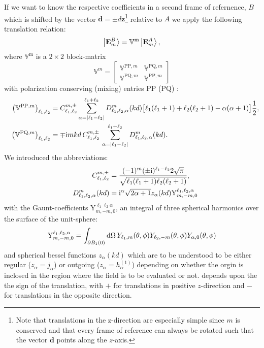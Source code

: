 If we want to know the respective coefficients in a second frame of refernence, $B$ which is shifted by the vector $\mathbf{d}=\pm d \mathbf{z}$\footnote{Note that translations in the z-direction are especially simple since $m$ is conserved and that every frame of reference can always be rotated such that the vector $\mathbf{d}$ points along the $z$-axis.} relative to $A$ we apply the following translation relation:
\begin{equation}
\ket{\mathbf{E}_m^B} = \mathbb{V}^\text{m} \ket{\mathbf{E}_m^A},
\end{equation}
where $\mathbb{V}^\text{m}$ is a $2\times 2$ block-matrix
\begin{equation}
\mathbb{V}^m = \left[
\begin{matrix}
\mathbb{V}^{\mathrm{PP},m} & \mathbb{V}^{\mathrm{PQ},m} \\
\mathbb{V}^{\mathrm{PQ},m} & \mathbb{V}^{\mathrm{PP},m}
\end{matrix}
\right]
\end{equation}
with polarization conserving (mixing) entries PP (PQ) \Cite{Wittmann1988}:
\begin{align}
&&\left(\mathbb{V}^{\mathrm{PP},m}\right)_{\ell_1,\ell_2} &= 
C^{m,\pm}_{\ell_1,\ell_2} \sum_{\alpha=|\ell_1-\ell_2|}^{\ell_1+\ell_2}
D^m_{\ell_1,\ell_2,\alpha}(kd) 
\big[\ell_1(\ell_1+1) + \ell_2(\ell_2+1)-\alpha(\alpha+1)\big]\frac{1}{2},\\
&&\left(\mathbb{V}^{\mathrm{PQ},m}\right)_{\ell_1,\ell_2} &= \mp \mathrm{i} m kd\,
C^{m,\pm}_{\ell_1,\ell_2} \,  \sum_{\alpha=|\ell_1-\ell_2|}^{\ell_1+\ell_2}
D^m_{\ell_1,\ell_2,\alpha}(kd).
\end{align}
We introduced the abbreviations:
\begin{align}
&&C^{m,\pm}_{\ell_1,\ell_2} &= \frac{(-1)^m (\pm \mathrm{i})^{\ell_1-\ell_2}2\sqrt{\pi}}
{\sqrt{\ell_1(\ell_1+1)\ell_2(\ell_2+1)}},\label{eqn:Ccoeff}
\\
&&D^m_{\ell_1,\ell_2,\alpha}(kd) &= \mathrm{i}^\alpha \sqrt{2\alpha+1} z_\alpha(kd)
\mathrm{Y}^{\ell_1, \ell_2, \alpha}_{m,-m,0}\label{eqn:Dcoeff}
\end{align}
with the Gaunt-coefficients $\mathrm{Y}^{\ell_1 \ell_2 \alpha}_{m,-m,0}$, an integral of three spherical harmonics over the surface of the unit-sphere:
\begin{equation}
\mathrm{Y}^{\ell_1, \ell_2, \alpha}_{m,-m,0} = \int_{\partial B_1(0)} \mathrm{d} \Omega \,
Y_{\ell_1,m}(\theta,\phi) Y_{\ell_2,-m}(\theta,\phi) Y_{\alpha,0} (\theta,\phi)
\label{eqn:Gaunt}
\end{equation}
and spherical bessel functions $z_\alpha(kd)$ which are to be understood to be either regular ($z_\alpha = j_\alpha$) or outgoing ($z_\alpha = h^{(1)}_\alpha$) depending on whether the orgin is inclosed in the region where the field is to be evaluated or not.    depends upon the the sign of the translation, with $+$ for translations in positive $z$-direction and $-$ for translations in the opposite direction.

